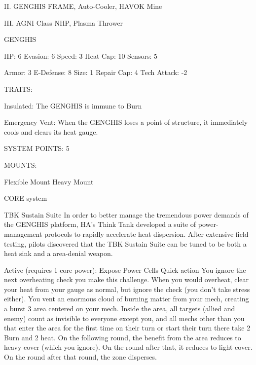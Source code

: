 II. GENGHIS FRAME, Auto-Cooler, HAVOK Mine
 
III. AGNI Class NHP, Plasma Thrower
 

                                                                                                                    


                                                GENGHIS 

HP: 6          Evasion: 6                            Speed: 3            Heat Cap: 10       Sensors: 5 

Armor: 3       E-Defense: 8                          Size: 1             Repair Cap: 4      Tech Attack: -2 

                                                  TRAITS: 

Insulated: The GENGHIS is immune to Burn
 
Emergency Vent: When the GENGHIS loses a point of structure, it immediately cools and clears its  
heat gauge. 

                                            SYSTEM POINTS: 5 

                                                 MOUNTS: 

Flexible Mount                                        Heavy Mount 

                                               CORE system 

                                            TBK Sustain Suite 
In order to better manage the tremendous power demands of the GENGHIS platform, HA’s Think Tank 
developed a suite of power-management protocols to rapidly accelerate heat dispersion. After extensive 
field testing, pilots discovered that the TBK Sustain Suite can be tuned to be both a heat sink and a 
area-denial weapon. 

Active (requires 1 core power): Expose Power Cells 
Quick action 
You ignore the next overheating check you make this challenge. When you would overheat, clear your 
heat from your gauge as normal, but ignore the check (you don’t take stress either). You vent an 
enormous cloud of burning matter from your mech, creating a burst 3 area centered on your mech. 
Inside the area, all targets (allied and enemy) count as invisible to everyone except you, and all mechs 
other than you that enter the area for the first time on their turn or start their turn there take 2 Burn and 
2 heat. 
On the following round, the benefit from the area reduces to heavy cover (which you ignore). On the 
round after that, it reduces to light cover. On the round after that round, the zone disperses. 

